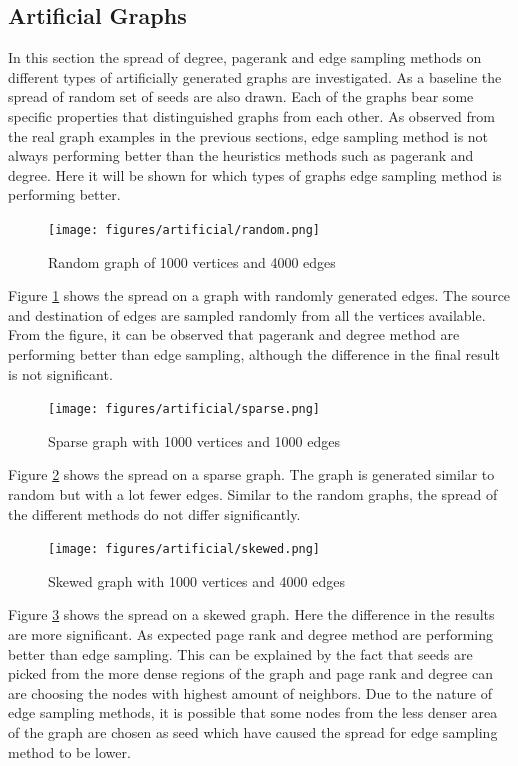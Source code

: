 \documentclass[english]{tktltiki}
\begin{document}
\subsection{Artificial Graphs}
In this section the spread of degree, pagerank and edge sampling methods on different types of artificially generated graphs are investigated. As a baseline the spread of random set of seeds are also drawn. Each of the graphs bear some specific properties that distinguished graphs from each other. As observed from the real graph examples in the previous sections, edge sampling method is not always performing better than the heuristics methods such as pagerank and degree. Here it will be shown for which types of graphs edge sampling method is performing better. 
\begin{figure}[ht!]
\centering
\texttt{[image: figures/artificial/random.png]}
\caption{Random graph of 1000 vertices and 4000 edges}
\label{art:random}
\end{figure}

Figure \ref{art:random} shows the spread on a graph with randomly generated edges. The source and destination of edges are sampled randomly from all the vertices available. From the figure, it can be observed that pagerank and degree method are performing better than edge sampling, although the difference in the final result is not significant. 

\begin{figure}[ht!]
\centering
\texttt{[image: figures/artificial/sparse.png]}
\caption{Sparse graph with 1000 vertices and 1000 edges}
\label{art:sparse}
\end{figure}

Figure \ref{art:sparse} shows the spread on a sparse graph. The graph is generated similar to random but with a lot fewer edges. Similar to the random graphs, the spread of the different methods do not differ significantly.

\begin{figure}[ht!]
\centering
\texttt{[image: figures/artificial/skewed.png]}
\caption{Skewed graph with 1000 vertices and 4000 edges}
\label{art:skewed}
\end{figure}

Figure \ref{art:skewed} shows the spread on a skewed graph. Here the difference in the results are more significant. As expected page rank and degree method are performing better than edge sampling. This can be explained by the fact that seeds are picked from the more dense regions of the graph and page rank and degree can are choosing the nodes with highest amount of neighbors. Due to the nature of edge sampling methods, it is possible that some nodes from the less denser area of the graph are chosen as seed which have caused the spread for edge sampling method to be lower.
\end{document}
